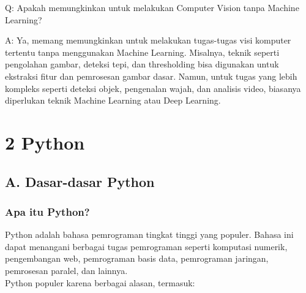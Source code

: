 \documentclass[
  letterpaper,
  DIV=11,
  numbers=noendperiod]{scrreprt}
\begin{document}
Q: Apakah memungkinkan untuk melakukan Computer Vision tanpa Machine
Learning?

A: Ya, memang memungkinkan untuk melakukan tugas-tugas visi komputer
tertentu tanpa menggunakan Machine Learning. Misalnya, teknik seperti
pengolahan gambar, deteksi tepi, dan thresholding bisa digunakan untuk
ekstraksi fitur dan pemrosesan gambar dasar. Namun, untuk tugas yang
lebih kompleks seperti deteksi objek, pengenalan wajah, dan analisis
video, biasanya diperlukan teknik Machine Learning atau Deep Learning.

\hypertarget{python}{%
\chapter*{2 Python}\label{python}}


\hypertarget{a.-dasar-dasar-python}{%
\section*{A. Dasar-dasar Python}\label{a.-dasar-dasar-python}}


\hypertarget{apa-itu-python}{%
\subsection*{Apa itu Python?}\label{apa-itu-python}}

Python adalah bahasa pemrograman tingkat tinggi yang populer. Bahasa ini
dapat menangani berbagai tugas pemrograman seperti komputasi numerik,
pengembangan web, pemrograman basis data, pemrograman jaringan,
pemrosesan paralel, dan lainnya.\\
Python populer karena berbagai alasan, termasuk:
\end{document}

